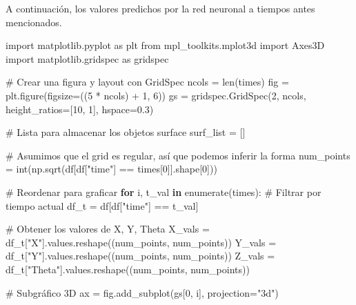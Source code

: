 \documentclass[
  spanish,
  us-letterpaper,
  DIV=11,
  numbers=noendperiod]{scrreprt}
\newenvironment{Shaded}{\begin{snugshade}}{\end{snugshade}}
\newcommand{\BuiltInTok}[1]{\textcolor[rgb]{0.00,0.23,0.31}{#1}}
\newcommand{\CommentTok}[1]{\textcolor[rgb]{0.37,0.37,0.37}{#1}}
\newcommand{\ControlFlowTok}[1]{\textcolor[rgb]{0.00,0.23,0.31}{\textbf{#1}}}
\newcommand{\DecValTok}[1]{\textcolor[rgb]{0.68,0.00,0.00}{#1}}
\newcommand{\FloatTok}[1]{\textcolor[rgb]{0.68,0.00,0.00}{#1}}
\newcommand{\ImportTok}[1]{\textcolor[rgb]{0.00,0.46,0.62}{#1}}
\newcommand{\KeywordTok}[1]{\textcolor[rgb]{0.00,0.23,0.31}{\textbf{#1}}}
\newcommand{\NormalTok}[1]{\textcolor[rgb]{0.00,0.23,0.31}{#1}}
\newcommand{\OperatorTok}[1]{\textcolor[rgb]{0.37,0.37,0.37}{#1}}
\newcommand{\StringTok}[1]{\textcolor[rgb]{0.13,0.47,0.30}{#1}}
\theoremstyle{definition}
\theoremstyle{plain}
\theoremstyle{remark}
\begin{document}
A continuación, los valores predichos por la red neuronal a tiempos
antes mencionados.

\begin{Shaded}
\begin{Highlighting}[]
\ImportTok{import}\NormalTok{ matplotlib.pyplot }\ImportTok{as}\NormalTok{ plt}
\ImportTok{from}\NormalTok{ mpl\_toolkits.mplot3d }\ImportTok{import}\NormalTok{ Axes3D}
\ImportTok{import}\NormalTok{ matplotlib.gridspec }\ImportTok{as}\NormalTok{ gridspec}

\CommentTok{\# Crear una figura y layout con GridSpec}
\NormalTok{ncols }\OperatorTok{=} \BuiltInTok{len}\NormalTok{(times)}
\NormalTok{fig }\OperatorTok{=}\NormalTok{ plt.figure(figsize}\OperatorTok{=}\NormalTok{((}\DecValTok{5} \OperatorTok{*}\NormalTok{ ncols) }\OperatorTok{+} \DecValTok{1}\NormalTok{, }\DecValTok{6}\NormalTok{))}
\NormalTok{gs }\OperatorTok{=}\NormalTok{ gridspec.GridSpec(}\DecValTok{2}\NormalTok{, ncols, height\_ratios}\OperatorTok{=}\NormalTok{[}\DecValTok{10}\NormalTok{, }\DecValTok{1}\NormalTok{], hspace}\OperatorTok{=}\FloatTok{0.3}\NormalTok{)}

\CommentTok{\# Lista para almacenar los objetos surface}
\NormalTok{surf\_list }\OperatorTok{=}\NormalTok{ []}

\CommentTok{\# Asumimos que el grid es regular, así que podemos inferir la forma}
\NormalTok{num\_points }\OperatorTok{=} \BuiltInTok{int}\NormalTok{(np.sqrt(df[df[}\StringTok{"time"}\NormalTok{] }\OperatorTok{==}\NormalTok{ times[}\DecValTok{0}\NormalTok{]].shape[}\DecValTok{0}\NormalTok{]))}

\CommentTok{\# Reordenar para graficar}
\ControlFlowTok{for}\NormalTok{ i, t\_val }\KeywordTok{in} \BuiltInTok{enumerate}\NormalTok{(times):}
    \CommentTok{\# Filtrar por tiempo actual}
\NormalTok{    df\_t }\OperatorTok{=}\NormalTok{ df[df[}\StringTok{"time"}\NormalTok{] }\OperatorTok{==}\NormalTok{ t\_val]}

    \CommentTok{\# Obtener los valores de X, Y, Theta}
\NormalTok{    X\_vals }\OperatorTok{=}\NormalTok{ df\_t[}\StringTok{"X"}\NormalTok{].values.reshape((num\_points, num\_points))}
\NormalTok{    Y\_vals }\OperatorTok{=}\NormalTok{ df\_t[}\StringTok{"Y"}\NormalTok{].values.reshape((num\_points, num\_points))}
\NormalTok{    Z\_vals }\OperatorTok{=}\NormalTok{ df\_t[}\StringTok{"Theta"}\NormalTok{].values.reshape((num\_points, num\_points))}

    \CommentTok{\# Subgráfico 3D}
\NormalTok{    ax }\OperatorTok{=}\NormalTok{ fig.add\_subplot(gs[}\DecValTok{0}\NormalTok{, i], projection}\OperatorTok{=}\StringTok{"3d"}\NormalTok{)}


\end{Highlighting}
\end{Shaded}
\end{document}
